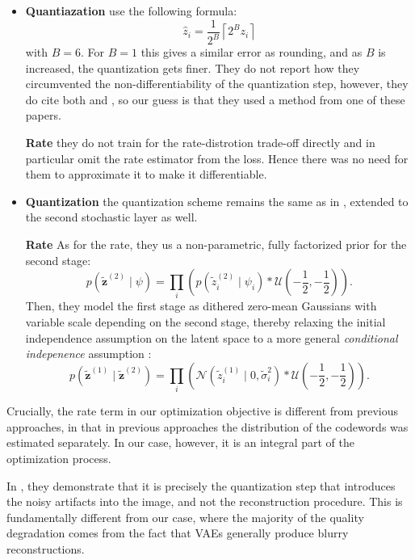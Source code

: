 \documentclass{article}
\renewcommand{\vec}[1]{\mathbf{#1}}
\newcommand{\Norm}[1]{\mathcal{N}\left( #1 \right)}
\newcommand{\Unif}[1]{\mathcal{U}\left( #1 \right)}
\begin{document}
\begin{itemize}
\item
  \textbf{Quantiazation }
  \cite{rippel2017real} use the following formula:
  \[
    \hat{z}_i = \frac{1}{2^B}\left\lceil 2^Bz_i \right\rceil
  \]
  with $B = 6$. For $B = 1$ this gives a similar error as rounding, and as $B$
  is increased, the quantization gets finer. They do not report how they
  circumvented the non-differentiability of the quantization step, however, they
  do cite both \cite{balle2016end} and \cite{theis2017lossy}, so our guess is
  that they used a method from one of these papers.

  \textbf{Rate } they do not train for the rate-distrotion trade-off directly
  and in particular omit the rate estimator from the loss. Hence there was no
  need for them to approximate it to make it differentiable.
\item
  \textbf{Quantization }
  \cite{balle2018variational} the quantization scheme remains the same as in
  \cite{balle2016end}, extended to the second stochastic layer as well.

  \textbf{Rate } 
  As for the rate, they us a non-parametric, fully factorized prior for the
  second stage:
  \[
    p(\vec{\tilde{z}}^{(2)} \mid \psi) =
    \prod_i \left(  p\left(\tilde{z}^{(2)}_i \mid \psi_i\right) *
      \Unif{-\frac{1}{2}, -\frac{1}{2}\right)}.
  \]
  Then, they model the first stage as dithered zero-mean Gaussians with variable
  scale depending on the second stage, thereby relaxing the initial independence
  assumption on the latent space to a more general \textit{conditional
    indepenence} assumption \cite{bishop1998latent}:
  \[
    p(\vec{\tilde{z}}^{(1)} \mid \vec{\tilde{z}}^{(2)}) = 
    \prod_i \left(  \Norm{\tilde{z}^{(1)}_i \mid 0, \tilde{\sigma}^2_i\right)*
      \Unif{-\frac{1}{2}, -\frac{1}{2}}}.
  \]
\end{itemize}

Crucially, the rate term in our optimization objective is different from
previous approaches, in that in previous approaches the distribution of the
codewords was estimated separately. In our case, however, it is an integral part
of the optimization process.

In \cite{theis2017lossy}, they demonstrate that it is precisely the quantization
step that introduces the noisy artifacts into the image, and not the
reconstruction procedure. This is fundamentally different from our case, where
the majority of the quality degradation comes from the fact that VAEs generally
produce blurry reconstructions.
\end{document}
